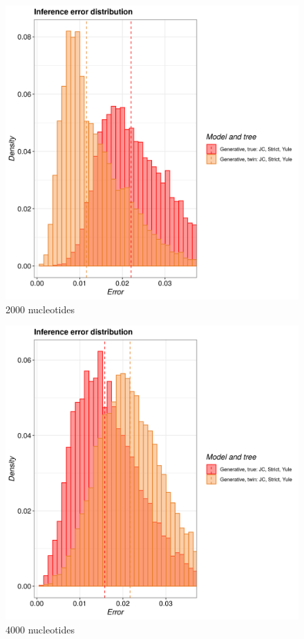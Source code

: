 \begin{figure}[H]
  \includegraphics[width=\textwidth]{pirouette_example_21/example_21_318/errors.png}
  \caption{2000 nucleotides}
\end{figure}

\begin{figure}[H]
  \includegraphics[width=\textwidth]{pirouette_example_21/example_21_319/errors.png}
  \caption{4000 nucleotides}
\end{figure}

